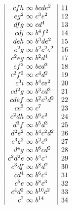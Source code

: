 \documentclass[11pt]{article}
\begin{document}
\[\begin{array}{c|r@{\ }c@{\ }l|c}
&cfh&\infty&bcde^2&11\\
&eg^2&\infty&c^3e^2&12\\
&dfg&\infty&cd^4&13\\
&cdj&\infty&b^4f^2&14\\
&deh&\infty&b^3de^2&15\\
&e^2g&\infty&b^2c^2e^2&16\\
&c^2eg&\infty&b^2d^4&17\\
&ef^2&\infty&bcd^3&18\\
&c^2f^2&\infty&c^4d^2&19\\
&c^3i&\infty&b^4ce^2&20\\
&cd^2g&\infty&b^3cd^3&21\\
&cdef&\infty&b^2c^3d^2&22\\
&ce^3&\infty&c^7&23\\
&c^2dh&\infty&b^6e^2&24\\
&d^3f&\infty&b^5d^3&25\\
&d^2e^2&\infty&b^4c^2d^2&26\\
&c^3e^2&\infty&b^2c^6&27\\
&d^4g&\infty&b^6cd^2&28\\
&c^2d^2e&\infty&b^4c^5&29\\
&c^3df&\infty&b^8d^2&30\\
&cd^4&\infty&b^6c^4&31\\
&c^5e&\infty&b^8c^3&32\\
&c^4d^2&\infty&b^{10}c^2&33\\
&c^7&\infty&b^{14}&34
\end{array}
\]
\clearpage
\end{document}
